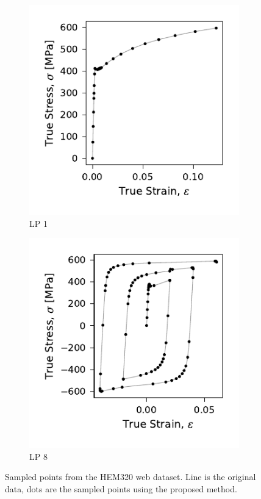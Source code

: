 \documentclass[a4paper,11pt]{article}
\begin{document}
\begin{figure}
    \centering
    \begin{subfigure}[b]{0.49\linewidth}
        \centering
        \includegraphics{LP1_dots_WP3_HEM320_C_CRM20.pdf}
        \caption{LP 1}
        \label{fig:hem320-lp1-results}
    \end{subfigure}
    \begin{subfigure}[b]{0.49\linewidth}
        \centering
        \includegraphics{LP8_dots_WP3_HEM320_C_CRM20.pdf}
        \caption{LP 8}
        \label{fig:hem320-lp8-results}
    \end{subfigure}
    \caption{Sampled points from the HEM320 web dataset. Line is the original data, dots are the sampled points using the proposed method.}
    \label{fig:sampled-compare-dots}
\end{figure}
\end{document}
